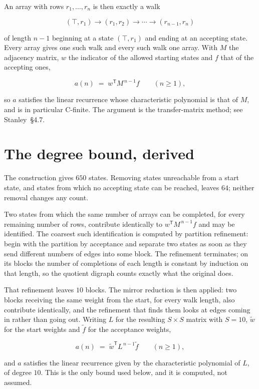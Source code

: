 \documentclass[11pt]{article}
\theoremstyle{definition}
\begin{document}
An array with rows $r_1,\dots,r_n$ is then exactly a walk

\[(\top,r_1) \to (r_1,r_2) \to \cdots \to (r_{n-1},r_n)\]

of length $n-1$ beginning at a state $(\top,r_1)$ and ending at an accepting state. Every array gives one such walk and every such walk one array. With $M$ the adjacency matrix, $w$ the indicator of the allowed starting states and $f$ that of the accepting ones,

\[a(n) \;=\; w^{\mathsf T} M^{\,n-1} f \qquad (n \ge 1),\]

so $a$ satisfies the linear recurrence whose characteristic polynomial is that of $M$, and is in particular C-finite. The argument is the transfer-matrix method; see Stanley~\S4.7.

\section{The degree bound, derived}

The construction gives $650$ states. Removing states unreachable from a start state, and states from which no accepting state can be reached, leaves $64$; neither removal changes any count.

Two states from which the same number of arrays can be completed, for every remaining number of rows, contribute identically to $w^{\mathsf T}M^{\,n-1}f$ and may be identified. The coarsest such identification is computed by partition refinement: begin with the partition by acceptance and separate two states as soon as they send different numbers of edges into some block. The refinement terminates; on its blocks the number of completions of each length is constant by induction on that length, so the quotient digraph counts exactly what the original does.

That refinement leaves $10$ blocks. The mirror reduction is then applied: two blocks receiving the same weight from the start, for every walk length, also contribute identically, and the refinement that finds them looks at edges coming in rather than going out. Writing $L$ for the resulting $S \times S$ matrix with $S = 10$, $\tilde w$ for the start weights and $\tilde f$ for the acceptance weights,

\[a(n) \;=\; \tilde w^{\mathsf T} L^{\,n-1} \tilde f \qquad (n \ge 1),\]

and $a$ satisfies the linear recurrence given by the characteristic polynomial of $L$, of degree $10$. This is the only bound used below, and it is computed, not assumed.
\end{document}
